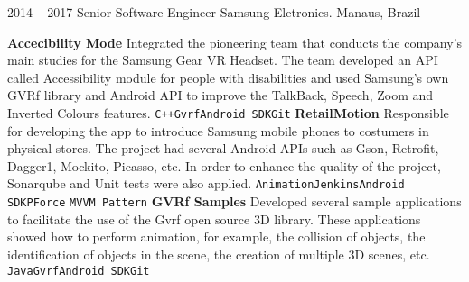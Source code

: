 \documentclass[9pt]{developercv} %
\begin{document}
\begin{entrylist}
\entry
		{2014 -- 2017}
		{Senior Software Engineer}
		{Samsung Eletronics. Manaus, Brazil}
{
\newline
\textbf{Accecibility Mode}  Integrated the pioneering team that conducts the company's main studies for the Samsung Gear VR Headset. The team developed an API called Accessibility module for people with disabilities and used Samsung's own GVRf library and Android API to improve the TalkBack, Speech, Zoom and Inverted Colours features.\newline
{\texttt{C++}\slashsep\texttt{Gvrf}\slashsep\texttt{Android SDK}\slashsep\texttt{Git}}
\newline 
\newline  
\textbf{RetailMotion} Responsible for developing the app to introduce Samsung mobile phones to costumers in physical stores. The project had several Android APIs such as Gson, Retrofit, Dagger1, Mockito, Picasso, etc. In order to enhance the quality of the project, Sonarqube and Unit tests were also applied.
  {\texttt{Animation}\slashsep\texttt{Jenkins}\slashsep\texttt{Android SDK}\slashsep\texttt{PForce} \texttt{MVVM Pattern}}
\newline
\newline
 \textbf{GVRf Samples} Developed several sample applications to facilitate the use of the Gvrf open source 3D library. These applications showed how to perform animation, for example, the collision of objects, the identification of objects in the scene, the creation of multiple 3D scenes, etc.
{\texttt{Java}\slashsep\texttt{Gvrf}\slashsep\texttt{Android SDK}\slashsep\texttt{Git}}

}
\end{entrylist}
\end{document}
